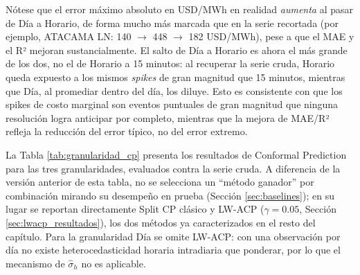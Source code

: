 Nótese que el error máximo absoluto en USD/MWh en realidad \emph{aumenta} al pasar de Día a Horario, de forma mucho más marcada que en la serie recortada (por ejemplo, ATACAMA LN: 140 $\to$ 448 $\to$ 182 USD/MWh), pese a que el MAE y el R² mejoran sustancialmente. El salto de Día a Horario es ahora el más grande de los dos, no el de Horario a 15 minutos: al recuperar la serie cruda, Horario queda expuesto a los mismos \textit{spikes} de gran magnitud que 15 minutos, mientras que Día, al promediar dentro del día, los diluye. Esto es consistente con que los spikes de costo marginal son eventos puntuales de gran magnitud que ninguna resolución logra anticipar por completo, mientras que la mejora de MAE/R² refleja la reducción del error típico, no del error extremo.

La Tabla \ref{tab:granularidad_cp} presenta los resultados de Conformal Prediction para las tres granularidades, evaluados contra la serie cruda. A diferencia de la versión anterior de esta tabla, no se selecciona un ``método ganador'' por combinación mirando su desempeño en prueba (Sección \ref{sec:baselines}); en su lugar se reportan directamente Split CP clásico y LW-ACP ($\gamma=0.05$, Sección \ref{sec:lwacp_resultados}), los dos métodos ya caracterizados en el resto del capítulo. Para la granularidad Día se omite LW-ACP: con una observación por día no existe heterocedasticidad horaria intradiaria que ponderar, por lo que el mecanismo de $\hat\sigma_h$ no es aplicable.

